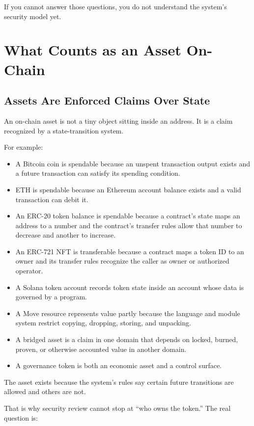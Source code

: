 If you cannot answer those questions, you do not understand the system's
security model yet.

\section{What Counts as an Asset On-Chain}

\subsection{Assets Are Enforced Claims Over State}

An on-chain asset is not a tiny object sitting inside an address. It is
a claim recognized by a state-transition system.

For example:

\begin{itemize}
\tightlist
\item
  A Bitcoin coin is spendable because an unspent transaction output
  exists and a future transaction can satisfy its spending condition.
\item
  ETH is spendable because an Ethereum account balance exists and a
  valid transaction can debit it.
\item
  An ERC-20 token balance is spendable because a contract's state maps
  an address to a number and the contract's transfer rules allow that
  number to decrease and another to increase.
\item
  An ERC-721 NFT is transferable because a contract maps a token ID to
  an owner and its transfer rules recognize the caller as owner or
  authorized operator.
\item
  A Solana token account records token state inside an account whose
  data is governed by a program.
\item
  A Move resource represents value partly because the language and
  module system restrict copying, dropping, storing, and unpacking.
\item
  A bridged asset is a claim in one domain that depends on locked,
  burned, proven, or otherwise accounted value in another domain.
\item
  A governance token is both an economic asset and a control surface.
\end{itemize}

The asset exists because the system's rules say certain future
transitions are allowed and others are not.

That is why security review cannot stop at ``who owns the token.'' The
real question is:

